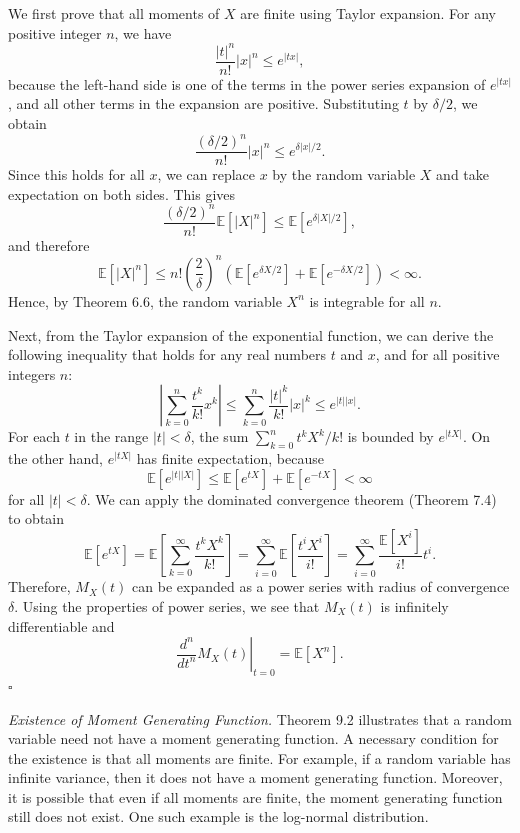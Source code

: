 We first prove that all moments of $X$ are finite using Taylor expansion. For any positive integer $n$, we have
\[
\frac{\lvert t\rvert^n}{n!}\lvert x\rvert^n \leq e^{\lvert tx\rvert},
\]
because the left-hand side is one of the terms in the power series expansion of $e^{\lvert tx\rvert}$, and all other terms in the expansion are positive. Substituting $t$ by $\delta/2$, we obtain
\[
\frac{(\delta/2)^n}{n!}\lvert x\rvert^n \leq e^{\delta\lvert x\rvert/2}.
\]
Since this holds for all $x$, we can replace $x$ by the random variable $X$ and take expectation on both sides. This gives
\[
\frac{(\delta/2)^n}{n!}\mathbb{E}[\lvert X\rvert^n]
\leq \mathbb{E}[e^{\delta\lvert X\rvert/2}],
\]
and therefore
\[
\mathbb{E}[\lvert X\rvert^n]
\leq n!\left(\frac{2}{\delta}\right)^n
\left(\mathbb{E}[e^{\delta X/2}]+\mathbb{E}[e^{-\delta X/2}]\right)
<\infty.
\]
Hence, by Theorem 6.6, the random variable $X^n$ is integrable for all $n$.

Next, from the Taylor expansion of the exponential function, we can derive the following inequality that holds for any real numbers $t$ and $x$, and for all positive integers $n$:
\[
\left\lvert \sum_{k=0}^{n}\frac{t^k}{k!}x^k \right\rvert
\leq \sum_{k=0}^{n}\frac{\lvert t\rvert^k}{k!}\lvert x\rvert^k
\leq e^{\lvert t\rvert\lvert x\rvert}.
\]
For each $t$ in the range $\lvert t\rvert<\delta$, the sum $\sum_{k=0}^{n}t^kX^k/k!$ is bounded by $e^{\lvert tX\rvert}$. On the other hand, $e^{\lvert tX\rvert}$ has finite expectation, because
\[
\mathbb{E}[e^{\lvert t\rvert\lvert X\rvert}]
\leq \mathbb{E}[e^{tX}]+\mathbb{E}[e^{-tX}]<\infty
\]
for all $\lvert t\rvert<\delta$. We can apply the dominated convergence theorem (Theorem 7.4) to obtain
\[
\mathbb{E}[e^{tX}]
= \mathbb{E}\left[\sum_{k=0}^{\infty}\frac{t^kX^k}{k!}\right]
= \sum_{i=0}^{\infty}\mathbb{E}\left[\frac{t^iX^i}{i!}\right]
= \sum_{i=0}^{\infty}\frac{\mathbb{E}[X^i]}{i!}t^i.
\]
Therefore, $M_X(t)$ can be expanded as a power series with radius of convergence $\delta$. Using the properties of power series, we see that $M_X(t)$ is infinitely differentiable and
\[
\left.\frac{d^n}{dt^n}M_X(t)\right|_{t=0} = \mathbb{E}[X^n].
\]
\hfill $\square$

\textit{Existence of Moment Generating Function.}
Theorem 9.2 illustrates that a random variable need not have a moment generating function. A necessary condition for the existence is that all moments are finite. For example, if a random variable has infinite variance, then it does not have a moment generating function. Moreover, it is possible that even if all moments are finite, the moment generating function still does not exist. One such example is the log-normal distribution.

